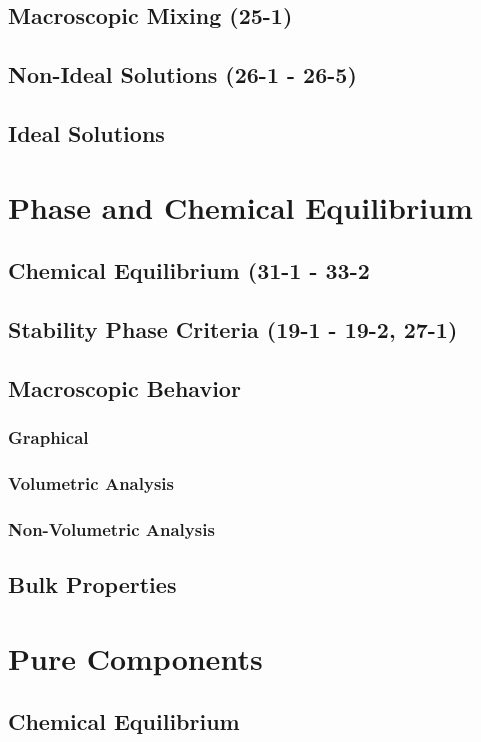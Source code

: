 \documentclass{mitqualif}
\begin{document}
\subsection{Macroscopic Mixing (25-1)}
\subsection{Non-Ideal Solutions (26-1 - 26-5)}
\subsection{Ideal Solutions}
\section{Phase and Chemical Equilibrium}
\subsection{Chemical Equilibrium (31-1 - 33-2}
\subsection{Stability Phase Criteria (19-1 - 19-2, 27-1)}
\subsection{Macroscopic Behavior}
\subsubsection{Graphical}
\subsubsection{Volumetric Analysis}
\subsubsection{Non-Volumetric Analysis}
\subsection{Bulk Properties}
\section{Pure Components}
\subsection{Chemical Equilibrium}
\end{document}
